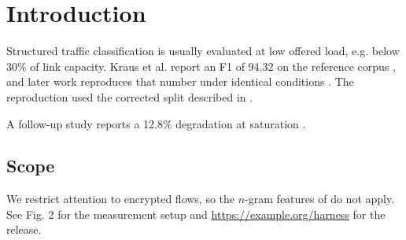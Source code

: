 \section{Introduction}
\label{sec:intro}

Structured traffic classification is usually evaluated at low offered load, e.g. below
30\% of link capacity. Kraus et al. report an F1 of 94.32 on the reference corpus
\citep{kraus2019}, and later work reproduces that number under identical conditions
\citep{kraus2019,ostrom2020}. The reproduction used the corrected split described in
\citep[p.~3]{ostrom2020}.

A follow-up study reports a 12.8\% degradation at saturation \citep{voss2021}.

\subsection{Scope}

We restrict attention to encrypted flows, so the $n$-gram features of \citet{nguyen2022}
do not apply. See Fig. 2 for the measurement setup and
\url{https://example.org/harness} for the release.
